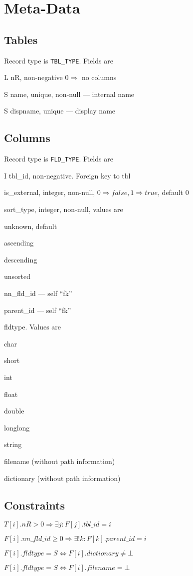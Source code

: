 
\newcommand{\YES}{\checkmark}

\section{Meta-Data}

\subsection{Tables}
Record type is \verb+TBL_TYPE+. Fields are 
\bi
\item {\sf L} nR, non-negative \(0 \Rightarrow \) no columns
\item {\sf S} name, unique, non-null --- internal name 
\item {\sf S} dispname, unique --- display name 
\ei

\subsection{Columns}

Record type is \verb+FLD_TYPE+. Fields are 
\be
\item {\sf I} tbl\_id, non-negative. Foreign key to tbl
\item is\_external, integer, non-null, 
\(0 \Rightarrow false, 1 \Rightarrow true\), default 0
\item sort\_type, integer, non-null, values are 
\be
\item unknown, default
\item ascending
\item descending
\item unsorted
\ee
\item nn\_fld\_id --- self ``fk''
\item parent\_id --- self ``fk''
\item fldtype. Values are 
\be
\item char
\item short
\item int
\item float
\item double
\item longlong
\item string
\ee
\item filename   (without path information)
\item dictionary (without path information)
\ee

\subsection{Constraints}

\be
\item \(T[i].nR > 0 \Rightarrow \exists j: F[j].tbl\_id = i\)
\item \(F[i].nn\_fld\_id \geq 0 \Rightarrow \exists ! k: F[k].parent\_id = i\)
\item \(F[i].fldtype = S \Leftrightarrow  F[i].dictionary \neq \bot\)
\item \(F[i].fldtype = S \Leftrightarrow  F[i].filename = \bot\)
\ee



